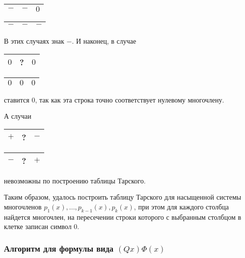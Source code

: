 \begin{center}
    \begin{tabular}{|c|c|c|}
        \hline
        $-$ & $-$ & $0$\\
        \hline
    \end{tabular}
        \quad
    \begin{tabular}{|c|c|c|}
        \hline
        $-$ & $-$ & $-$\\
        \hline
    \end{tabular}           
\end{center}
В этих случаях знак $-$.
И наконец, в случае 
\begin{center}
    \begin{tabular}{|c|c|c|}
        \hline
        $0$ & ? & $0$\\
        \hline
    \end{tabular} 
\end{center}
\begin{center}
    \begin{tabular}{|c|c|c|}
        \hline
        $0$ & $0$ & $0$\\
        \hline
    \end{tabular} 
\end{center}
ставится $0$, так как эта строка точно соответствует нулевому многочлену.

А случаи
\begin{center}
    \begin{tabular}{|c|c|c|}
        \hline
        $+$ & ? & $-$\\
        \hline
    \end{tabular}
        \quad
    \begin{tabular}{|c|c|c|}
        \hline
        $-$ & ? & $+$\\
        \hline
    \end{tabular}      
\end{center}
невозможны по построению таблицы Тарского.

Таким образом, удалось построить таблицу Тарского для насыщенной системы многочленов $p_1(x), ... , p_{k-1}(x), p_k(x)$, при этом для каждого столбца найдется многочлен, на пересечении строки которого с выбранным столбцом в клетке записан символ $0$.

\subsubsection{Алгоритм для формулы вида $(Qx)\Phi(x)$}

